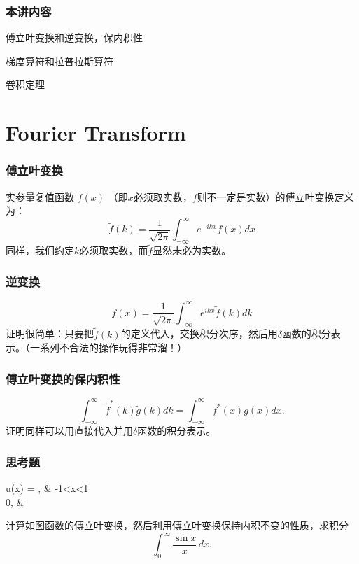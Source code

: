 \documentclass[CJK,13pt]{beamer}
\date{}
\begin{document}
  \bch
{}


\begin{frame}
\frametitle{本讲内容}

\bitem
\item{傅立叶变换和逆变换，保内积性}
\item{梯度算符和拉普拉斯算符}
\item{卷积定理}
\eitem

\end{frame}

\section{Fourier Transform}
\begin{frame}
  \frametitle{傅立叶变换}
  实参量复值函数 $f(x)$ （即$x$必须取实数，$f$则不一定是实数）的傅立叶变换定义为：
  $$ \widetilde{f}(k) = \frac{1}{\sqrt{2\pi}} \int_{-\infty}^\infty e^{-ikx} f(x) dx $$
  同样，我们约定$k$必须取实数，而$\widetilde{f}$显然未必为实数。

\end{frame}


\begin{frame}
  \frametitle{逆变换}
  $$ f(x) = \frac{1}{\sqrt{2\pi}} \int_{-\infty}^\infty e^{ikx} \widetilde{f}(k) dk $$
  证明很简单：只要把$\widetilde{f}(k)$的定义代入，交换积分次序，然后用$\delta$函数的积分表示。（一系列不合法的操作玩得非常溜！）
  

\end{frame}


\begin{frame}
  \frametitle{傅立叶变换的保内积性}

 $$\int_{-\infty}^\infty \widetilde{f}^*(k) \widetilde{g}(k) dk = \int_{-\infty}^\infty f^*(x)g(x) dx. $$
  证明同样可以用直接代入并用$\delta$函数的积分表示。
  
\end{frame}


\begin{frame}
  \frametitle{思考题}
  
  \emini
  \be
  u(x) = , &  -1<x<1 \\ 0, &  \branchrr
  \ee
  \emini

  \skipline
  
  计算如图函数的傅立叶变换，然后利用傅立叶变换保持内积不变的性质，求积分
  $$\int_0^\infty \frac{\sin x}{x} \,dx. $$
  
  
\end{frame}
\end{document}
